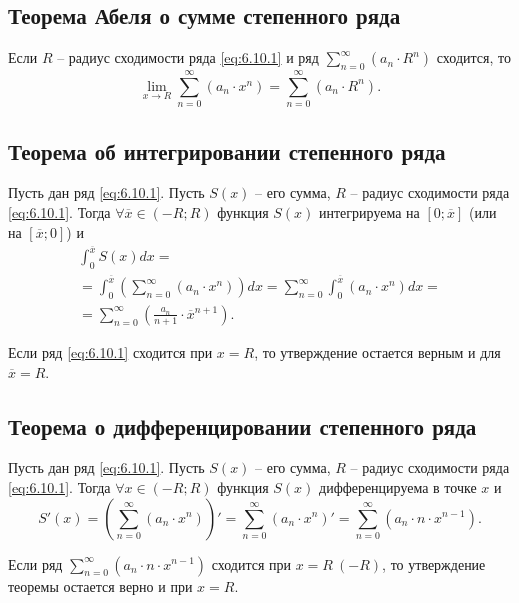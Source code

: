 \subsection{Теорема Абеля о сумме степенного ряда}

\begin{theorem}
    Если $R$ -- радиус сходимости ряда \ref{eq:6.10.1} и ряд $\sum_{n=0}^{\infty}(a_n \cdot R^n)$ сходится, то
    \[
        \underset{x\rightarrow R}{\lim}\sum_{n=0}^{\infty}(a_n \cdot x^n) = \sum_{n=0}^{\infty} (a_n \cdot R^n).
    \]
\end{theorem}

\subsection{Теорема об интегрировании степенного ряда}

\begin{theorem}
    Пусть дан ряд \ref{eq:6.10.1}. Пусть $S(x)$ -- его сумма, $R$ -- радиус сходимости ряда \ref{eq:6.10.1}. Тогда $\forall \overline{x} \in (-R;R)$ функция $S(x)$ интегрируема на $[0;\overline{x}]$ (или на $[\overline{x};0]$) и
    \begin{multline*}
        \int_{0}^{\overline{x}}S(x)dx = \\
        = \int_{0}^{\overline{x}}\left(\sum_{n=0}^{\infty}(a_n \cdot x^n)\right)dx = \sum_{n=0}^{\infty}\int_{0}^{\overline{x}}(a_n \cdot x^n)dx = \\
        = \sum_{n=0}^{\infty} \left(\frac{a_n}{n+1}\cdot \overline{x}^{n+1}\right).
    \end{multline*}

    Если ряд \ref{eq:6.10.1} сходится при $x = R$, то утверждение остается верным и для $\overline{x} = R$.
\end{theorem}

\subsection{Теорема о дифференцировании степенного ряда}

\begin{theorem}
    Пусть дан ряд \ref{eq:6.10.1}. Пусть $S(x)$ -- его сумма, $R$ -- радиус сходимости ряда \ref{eq:6.10.1}. Тогда $\forall x \in (-R;R)$ функция $S(x)$ дифференцируема в точке $x$ и
    \[
        S'(x) = \left(\sum_{n=0}^{\infty}(a_n \cdot x^n)\right)' = \sum_{n=0}^{\infty}(a_n \cdot x^n)' = \sum_{n=0}^{\infty}(a_n \cdot n \cdot x^{n-1}).
    \]

    Если ряд $\sum_{n=0}^{\infty}(a_n \cdot n \cdot x^{n-1})$ сходится при $x = R \ (-R)$, то утверждение теоремы остается верно и при $x = R$.
\end{theorem}


